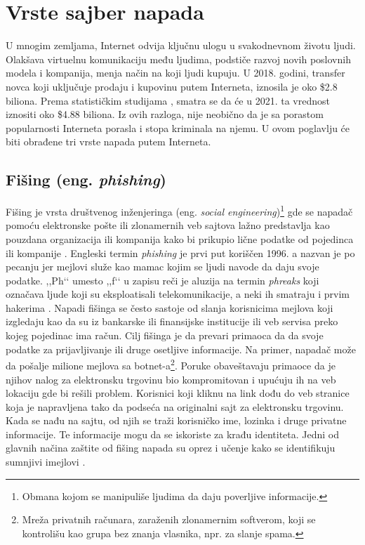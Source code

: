 \documentclass[a4paper]{article}
\theoremstyle{break}
\begin{document}
{\section{Vrste sajber napada}

\label{sec:vrste_sajber_napada}

U mnogim zemljama, Internet odvija ključnu ulogu u svakodnevnom životu ljudi. Olakšava virtuelnu komunikaciju među ljudima, podstiče razvoj novih poslovnih modela i kompanija, menja način na koji ljudi kupuju. U 2018. godini, transfer novca koji uključuje prodaju i kupovinu putem Interneta, iznosila je oko \$2.8 biliona. Prema statističkim studijama \cite{statistika}, smatra se da će u 2021. ta vrednost iznositi oko \$4.88 biliona. Iz ovih razloga, nije neobično da je sa porastom popularnosti Interneta porasla i stopa kriminala na njemu. U ovom poglavlju će biti obrađene tri vrste napada putem Interneta.



\subsection{Fišing (eng. {\em phishing})}
\label{subsec:phishing}

Fišing je vrsta društvenog inženjeringa (eng. {\em social engineering})\footnote{Obmana kojom se manipuliše ljudima da daju poverljive informacije.} gde se napadač pomoću elektronske pošte ili zlonamernih veb sajtova lažno predstavlja kao pouzdana organizacija ili kompanija kako bi prikupio lične podatke od pojedinca ili kompanije \cite{phishing_us_cert}. Engleski termin {\em  phishing} je prvi put koriščen 1996. a nazvan je po pecanju jer mejlovi služe kao mamac kojim se ljudi navode da daju svoje podatke. ,,Ph‘‘ umesto ,,f‘‘ u zapisu reči je aluzija na termin {\em phreaks} koji označava ljude koji su eksploatisali telekomunikacije, a neki ih smatraju i prvim hakerima \cite{phishing_org}.
Napadi fišinga se često sastoje od slanja korisnicima mejlova koji izgledaju kao da su iz bankarske ili finansijske institucije ili veb servisa preko kojeg pojedinac ima račun. Cilj fišinga je da prevari primaoca da da svoje podatke za prijavljivanje ili druge osetljive informacije. 
Na primer, napadač može da pošalje milione mejlova sa botnet-a\footnote{Mreža privatnih računara, zaraženih zlonamernim softverom, koji se kontrolišu kao grupa bez znanja vlasnika, npr. za slanje spama.}. Poruke obaveštavaju primaoce da je njihov nalog za elektronsku trgovinu bio kompromitovan i upućuju ih na veb lokaciju gde bi rešili problem. Korisnici koji kliknu na link dođu do veb stranice koja je napravljena tako da podseća na originalni sajt za elektronsku trgovinu. Kada se nađu na sajtu, od njih se traži korisničko ime, lozinka i druge privatne informacije. Te informacije mogu da se iskoriste za krađu identiteta. Jedni od glavnih načina zaštite od fišing napada su oprez i učenje kako se identifikuju sumnjivi imejlovi \cite{phishing_prevent}.

}
\end{document}
